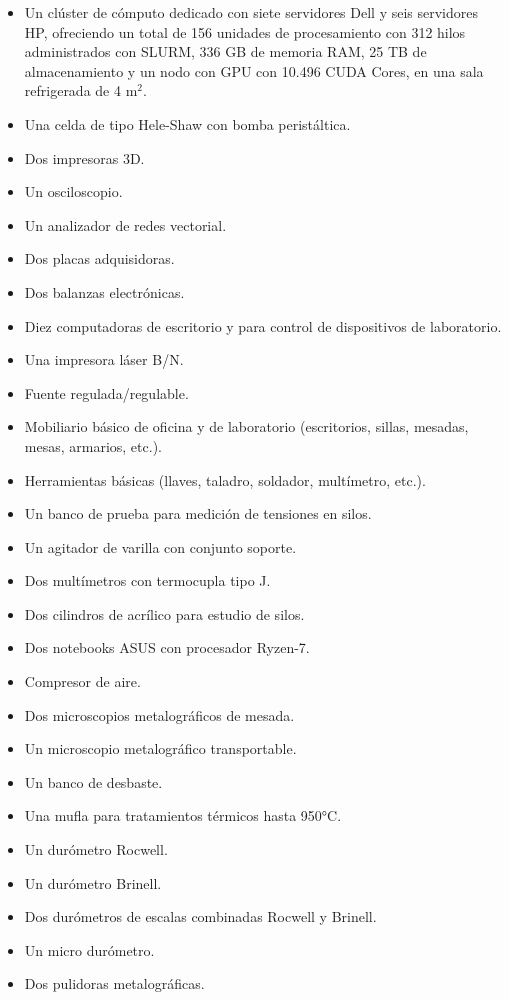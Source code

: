 \documentclass[a4paper,11pt,twoside,final,titlepage,onecolumn,openright]{report}
\begin{document}
\begin{itemize}
	\item Un clúster de cómputo dedicado con siete servidores Dell y seis servidores HP, ofreciendo un total de 156 unidades de procesamiento con 312 hilos administrados con SLURM, 336 GB de memoria RAM, 25 TB de almacenamiento y un nodo con GPU con 10.496 CUDA Cores, en una sala refrigerada de 4 m$^2$.
	\item Una celda de tipo Hele-Shaw con bomba peristáltica.
	\item Dos impresoras 3D.
	\item Un osciloscopio.
	\item Un analizador de redes vectorial.
	\item Dos placas adquisidoras.
	\item Dos balanzas electrónicas.
	\item Diez computadoras de escritorio y para control de dispositivos de laboratorio.
	\item Una impresora láser B/N.
	\item Fuente regulada/regulable.
	\item Mobiliario básico de oficina y de laboratorio (escritorios, sillas, mesadas, mesas, armarios, etc.).
	\item Herramientas básicas (llaves, taladro, soldador, multímetro, etc.).
	\item Un banco de prueba para medición de tensiones en silos.
	\item Un agitador de varilla con conjunto soporte.
	\item Dos multímetros con termocupla tipo J.
	\item Dos cilindros de acrílico para estudio de silos.
	\item Dos notebooks ASUS con procesador Ryzen-7.
	\item Compresor de aire.
	\item Dos microscopios metalográficos de mesada.
	\item Un microscopio metalográfico transportable.
	\item Un banco de desbaste.
	\item Una mufla para tratamientos térmicos hasta 950°C.
	\item Un durómetro Rocwell.
	\item Un durómetro Brinell.
	\item Dos durómetros de escalas combinadas Rocwell y Brinell.
	\item Un micro durómetro.
	\item Dos pulidoras metalográficas.

\end{itemize}
\end{document}
